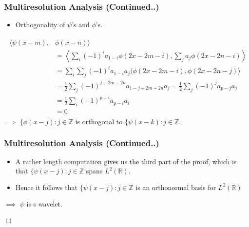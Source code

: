 \documentclass{beamer}
\newcommand{\qedwhite}{\hfill \ensuremath{\Box}}
\begin{document}
\begin{frame}
    \frametitle{Multiresolution Analysis (Continued..)}
\begin{itemize}
    \item Orthogonality of $\psi$'s and $\phi$'s.
\end{itemize}
\begin{eqnarray*}
    \begin{split}
        \langle \psi(x-m), & \phi(x-n)\rangle \\
        &= \left\langle \sum_i (-1)^i a_{1-i}\phi(2x-2m-i),  \sum_j a_j\phi(2x-2n-i) \right\rangle \\
        &= \sum_i\sum_j (-1)^{i}a_{1-i}a_j \langle \phi(2x-2m-i), \phi(2x-2n-j)\rangle\\
        &= \frac{1}{2} \sum_j  (-1)^{j+2m-2n}a_{1-j+2m-2n}a_j = \frac{1}{2} \sum_j  (-1)^{j}a_{p-j}a_j\\
        &= \frac{1}{2} \sum_i  (-1)^{p-i}a_{p-i}a_i\\
        &= 0
    \end{split}
\end{eqnarray*}
$\implies$ $\{\phi(x-j) : j \in  \mathbb{Z}$ is orthogonal to $\{\psi(x-k) : j \in  \mathbb{Z}$.
\end{frame}


\begin{frame}
    \frametitle{Multiresolution Analysis (Continued..)}
\begin{itemize}
    \item A rather length computation gives us the third part of the proof, which is that $\{\psi(x-j) : j \in  \mathbb{Z}$ spans $L^2(\mathbb{R})$.
    \item Hence it follows that $\{\psi(x-j) : j \in  \mathbb{Z}$ is an orthonormal basis for $L^2(\mathbb{R})$
\end{itemize}

$\implies$ $\psi$  is s wavelet.

\qedwhite

\end{frame}

\end{document}
